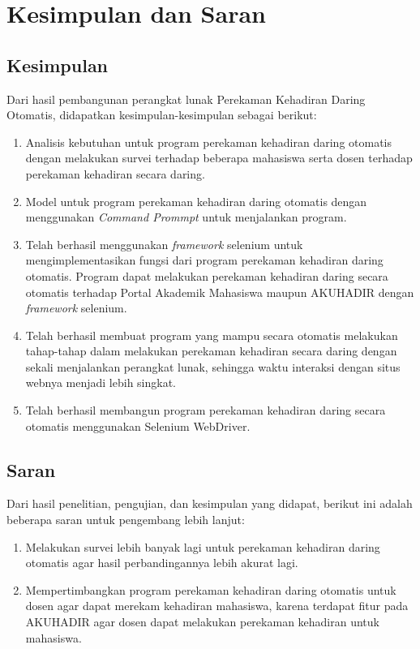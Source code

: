 \chapter{Kesimpulan dan Saran}
\label{chap:simpulandansaran}

\section{Kesimpulan}
\label{sec:kesimpulan} 
Dari hasil pembangunan perangkat lunak Perekaman Kehadiran Daring Otomatis, didapatkan kesimpulan-kesimpulan sebagai berikut:
\begin{enumerate}
	\item Analisis kebutuhan untuk program perekaman kehadiran daring otomatis dengan melakukan survei terhadap beberapa mahasiswa serta dosen terhadap perekaman kehadiran secara daring.
	\item Model untuk program perekaman kehadiran daring otomatis dengan menggunakan \textit{Command Prommpt} untuk menjalankan program.
	\item Telah berhasil menggunakan \textit{framework} selenium untuk mengimplementasikan fungsi dari program perekaman kehadiran daring otomatis. Program dapat melakukan perekaman kehadiran daring secara otomatis terhadap Portal Akademik Mahasiswa maupun AKUHADIR dengan \textit{framework} selenium.
	\item Telah berhasil membuat program yang mampu secara otomatis melakukan tahap-tahap dalam melakukan perekaman kehadiran secara daring dengan sekali menjalankan perangkat lunak, sehingga waktu interaksi dengan situs webnya menjadi lebih singkat. 
	\item Telah berhasil membangun program perekaman kehadiran daring secara otomatis menggunakan Selenium WebDriver.
\end{enumerate}

\section{Saran}
\label{sec:saran} 
Dari hasil penelitian, pengujian, dan kesimpulan yang didapat, berikut ini adalah beberapa saran untuk pengembang lebih lanjut:
\begin{enumerate}
	\item Melakukan survei lebih banyak lagi untuk perekaman kehadiran daring otomatis agar hasil perbandingannya lebih akurat lagi.
	\item Mempertimbangkan program perekaman kehadiran daring otomatis untuk dosen agar dapat merekam kehadiran mahasiswa, karena terdapat fitur pada AKUHADIR agar dosen dapat melakukan perekaman kehadiran untuk mahasiswa.
\end{enumerate}


